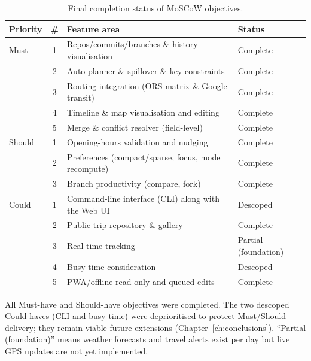 \begin{table}[H]
\centering
\caption{Final completion status of MoSCoW objectives.}
\label{tab:moscow-final}
\begin{tabularx}{\textwidth}{p{} c X p{}}
\toprule
\textbf{Priority} & \textbf{\#} & \textbf{Feature area} & \textbf{Status}\\
\midrule
Must & 1 & Repos/commits/branches \& history visualisation & Complete\\
 & 2 & Auto-planner \& spillover \& key constraints & Complete\\
 & 3 & Routing integration (ORS matrix \& Google transit) & Complete\\
 & 4 & Timeline \& map visualisation and editing & Complete\\
 & 5 & Merge \& conflict resolver (field-level) & Complete\\
\midrule
Should & 1 & Opening-hours validation and nudging & Complete\\
 & 2 & Preferences (compact/sparse, focus, mode recompute) & Complete\\
 & 3 & Branch productivity (compare, fork) & Complete\\
\midrule
Could & 1 & Command-line interface (CLI) along with the Web UI & Descoped\\
 & 2 & Public trip repository \& gallery & Complete\\
 & 3 & Real-time tracking & Partial (foundation)\\
 & 4 & Busy-time consideration & Descoped\\
 & 5 & PWA/offline read-only and queued edits & Complete\\
\bottomrule
\end{tabularx}
\end{table}

All Must-have and Should-have objectives were completed. The two descoped Could-haves (CLI and busy-time) were deprioritised to protect Must/Should delivery; they remain viable future extensions (Chapter~\ref{ch:conclusions}). ``Partial (foundation)'' means weather forecasts and travel alerts exist per day but live GPS updates are not yet implemented.


